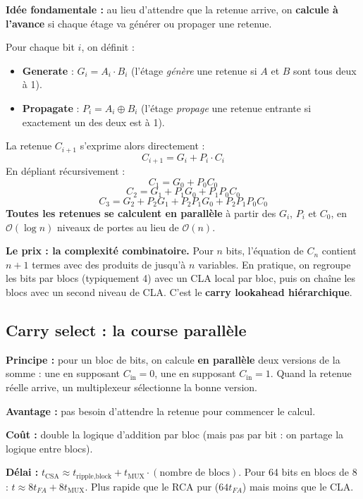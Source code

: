 \documentclass[12pt,a4paper,twoside]{book}
\begin{document}
\begin{formule}
\textbf{Idée fondamentale :} au lieu d'attendre que la retenue arrive, on \textbf{calcule à l'avance} si chaque étage va générer ou propager une retenue.

Pour chaque bit $i$, on définit :
\begin{itemize}[nosep]
\item \textbf{Generate} : $G_i = A_i \cdot B_i$ (l'étage \textit{génère} une retenue si $A$ et $B$ sont tous deux à 1).
\item \textbf{Propagate} : $P_i = A_i \oplus B_i$ (l'étage \textit{propage} une retenue entrante si exactement un des deux est à 1).
\end{itemize}

La retenue $C_{i+1}$ s'exprime alors directement :
\[
C_{i+1} = G_i + P_i \cdot C_i
\]
En dépliant récursivement :
\[
C_1 = G_0 + P_0 C_0
\]
\[
C_2 = G_1 + P_1 G_0 + P_1 P_0 C_0
\]
\[
C_3 = G_2 + P_2 G_1 + P_2 P_1 G_0 + P_2 P_1 P_0 C_0
\]
\textbf{Toutes les retenues se calculent en parallèle} à partir des $G_i$, $P_i$ et $C_0$, en $\mathcal{O}(\log n)$ niveaux de portes au lieu de $\mathcal{O}(n)$.
\end{formule}

\begin{intuition}
\textbf{Le prix : la complexité combinatoire.} Pour $n$ bits, l'équation de $C_n$ contient $n+1$ termes avec des produits de jusqu'à $n$ variables. En pratique, on regroupe les bits par blocs (typiquement 4) avec un CLA local par bloc, puis on chaîne les blocs avec un second niveau de CLA. C'est le \textbf{carry lookahead hiérarchique}.
\end{intuition}

\subsection{Carry select : la course parallèle}

\begin{formule}
\textbf{Principe :} pour un bloc de bits, on calcule \textbf{en parallèle} deux versions de la somme : une en supposant $C_{\text{in}} = 0$, une en supposant $C_{\text{in}} = 1$. Quand la retenue réelle arrive, un multiplexeur sélectionne la bonne version.

\textbf{Avantage :} pas besoin d'attendre la retenue pour commencer le calcul.

\textbf{Coût :} double la logique d'addition par bloc (mais pas par bit : on partage la logique entre blocs).

\textbf{Délai :} $t_{\text{CSA}} \approx t_{\text{ripple,block}} + t_{\text{MUX}} \cdot (\text{nombre de blocs})$. Pour 64 bits en blocs de 8 : $t \approx 8 t_{FA} + 8 t_{\text{MUX}}$. Plus rapide que le RCA pur ($64 t_{FA}$) mais moins que le CLA.
\end{formule}
\end{document}
